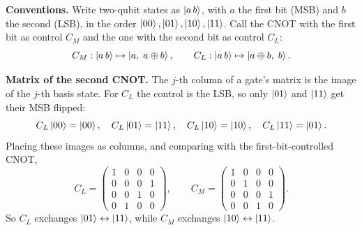 \documentclass[a4paper, 10pt]{article}
\begin{document}
\begin{solution}
	\noindent \textbf{Conventions.} Write two-qubit states as \( \ket{a\,b} \), with \( a \) the first bit (MSB) and \( b \) the second (LSB), in the order \( \ket{00}, \ket{01}, \ket{10}, \ket{11} \).
	Call the CNOT with the first bit as control \( C_M \) and the one with the second bit as control \( C_L \):
	\[
		C_M : \ket{a\,b} \mapsto \ket{a,\; a \oplus b},
		\qquad
		C_L : \ket{a\,b} \mapsto \ket{a \oplus b,\; b}.
	\]

	\noindent \textbf{Matrix of the second CNOT.} The \( j \)-th column of a gate's matrix is the image of the \( j \)-th basis state.
	For \( C_L \) the control is the LSB, so only \( \ket{01} \) and \( \ket{11} \) get their MSB flipped:
	\[
		C_L\ket{00} = \ket{00}, \quad
		C_L\ket{01} = \ket{11}, \quad
		C_L\ket{10} = \ket{10}, \quad
		C_L\ket{11} = \ket{01}.
	\]
	Placing these images as columns, and comparing with the first-bit-controlled CNOT,
	\[
		C_L = \begin{pmatrix}
			1 & 0 & 0 & 0 \\
			0 & 0 & 0 & 1 \\
			0 & 0 & 1 & 0 \\
			0 & 1 & 0 & 0
		\end{pmatrix},
		\qquad
		C_M = \begin{pmatrix}
			1 & 0 & 0 & 0 \\
			0 & 1 & 0 & 0 \\
			0 & 0 & 0 & 1 \\
			0 & 0 & 1 & 0
		\end{pmatrix}.
	\]
	So \( C_L \) exchanges \( \ket{01} \leftrightarrow \ket{11} \), while \( C_M \) exchanges \( \ket{10} \leftrightarrow \ket{11} \).


\end{solution}
\end{document}
